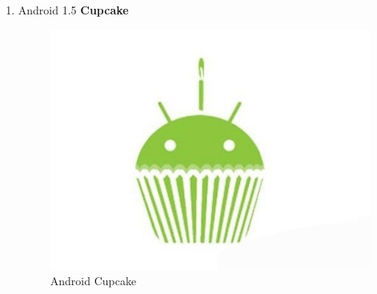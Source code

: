 \begin{enumerate}
\item Android 1.5 \textbf{Cupcake}\\
\begin{figure}[!htbp]
    \centering
    \includegraphics[scale = 0.3]{pictures/android-cupcake.jpg}
    \caption{Android Cupcake}
    \label{}
\end{figure}


\end{enumerate}
